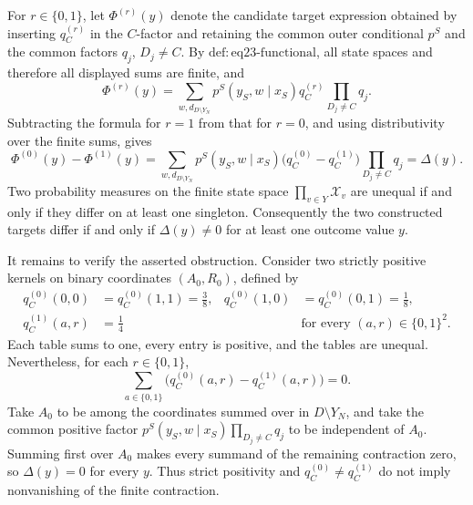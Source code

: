 For \(r\in\{0,1\}\), let \(\Phi^{(r)}(y)\) denote the candidate target expression obtained by inserting \(q_C^{(r)}\) in the \(C\)-factor and retaining the common outer conditional \(p^S\) and the common factors \(q_j\), \(D_j\ne C\).  By \(\mathrm{def:eq23\text{-}functional}\), all state spaces and therefore all displayed sums are finite, and
\[
 \Phi^{(r)}(y)
 =\sum_{w,d_{D\setminus Y_N}}
 p^S(y_S,w\mid x_S)
 q_C^{(r)}
 \prod_{D_j\ne C}q_j .
\]
Subtracting the formula for \(r=1\) from that for \(r=0\), and using distributivity over the finite sums, gives
\[
 \Phi^{(0)}(y)-\Phi^{(1)}(y)
 =\sum_{w,d_{D\setminus Y_N}}
 p^S(y_S,w\mid x_S)
 \bigl(q_C^{(0)}-q_C^{(1)}\bigr)
 \prod_{D_j\ne C}q_j
 =\Delta(y).
\]
Two probability measures on the finite state space \(\prod_{v\in Y}\mathcal X_v\) are unequal if and only if they differ on at least one singleton.  Consequently the two constructed targets differ if and only if \(\Delta(y)\ne0\) for at least one outcome value \(y\).

It remains to verify the asserted obstruction.  Consider two strictly positive kernels on binary coordinates \((A_0,R_0)\), defined by
\[
 \begin{aligned}
 q_C^{(0)}(0,0)&=q_C^{(0)}(1,1)=\frac38,&
 q_C^{(0)}(1,0)&=q_C^{(0)}(0,1)=\frac18,\\
 q_C^{(1)}(a,r)&=\frac14&&\text{for every }(a,r)\in\{0,1\}^2.
 \end{aligned}
\]
Each table sums to one, every entry is positive, and the tables are unequal.  Nevertheless, for each \(r\in\{0,1\}\),
\[
 \sum_{a\in\{0,1\}}
 \bigl(q_C^{(0)}(a,r)-q_C^{(1)}(a,r)\bigr)=0.
\]
Take \(A_0\) to be among the coordinates summed over in \(D\setminus Y_N\), and take the common positive factor
\(p^S(y_S,w\mid x_S)\prod_{D_j\ne C}q_j\) to be independent of \(A_0\).  Summing first over \(A_0\) makes every summand of the remaining contraction zero, so \(\Delta(y)=0\) for every \(y\).  Thus strict positivity and \(q_C^{(0)}\ne q_C^{(1)}\) do not imply nonvanishing of the finite contraction.